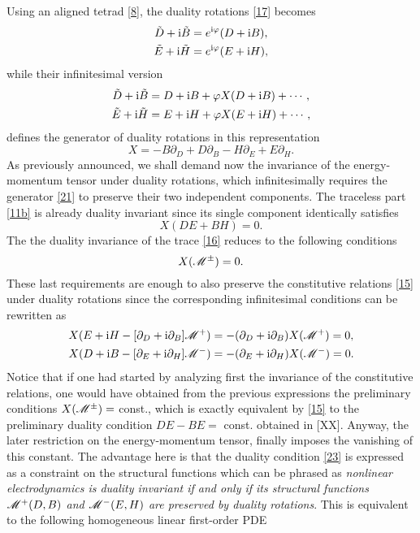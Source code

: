 Using an aligned tetrad \eqref{8}, the duality rotations \eqref{17} becomes
\begin{subequations}\label{19}
	\begin{align}
  \tilde{D}+\mathrm{i}\tilde{B}&=e^{\mathrm{i} \varphi}(D+\mathrm{i} B),\\
  \tilde{E}+\mathrm{i} \tilde{H}&=e^{\mathrm{i} \varphi}(E+\mathrm{i} H),
\end{align}
\end{subequations}
while their infinitesimal version
\begin{subequations}\label{20}
	\begin{align}
  \tilde{D}+\mathrm{i}\tilde{B}&=D+\mathrm{i} B+\varphi X(D+\mathrm{i} B)+\cdots,\\
  \tilde{E}+\mathrm{i} \tilde{H}&=E+\mathrm{i} H+\varphi X(E+\mathrm{i} H)+\cdots,
\end{align}
\end{subequations}
defines the generator of duality rotations in this representation
\begin{equation}\label{21}
  X=-B\partial_D+D\partial_B-H\partial_E+E\partial_H.
\end{equation}
As previously announced, we shall demand now the invariance of the energy-momentum tensor under duality rotations, which infinitesimally requires the generator \eqref{21} to preserve their two independent components. The traceless part \eqref{11b} is already duality invariant since its single component identically satisfies
\begin{equation}\label{22}
  X(DE+BH)=0.
\end{equation}
The the duality invariance of the trace \eqref{16} reduces to the following conditions
\begin{equation}\label{23}
  X(\mathscr{M}^{\pm })=0.
\end{equation}
These last requirements are enough to also preserve the constitutive relations \eqref{15} under duality rotations since the corresponding infinitesimal conditions can be rewritten as
\begin{subequations}
	\begin{align}
  X(E+\mathrm{i} H-[\partial_D+\mathrm{i} \partial_B]\mathscr{M}^+)&=-(\partial_D+\mathrm{i} \partial_B)X(\mathscr{M}^+)=0,\\
  X(D+\mathrm{i} B-[\partial_E+\mathrm{i} \partial_H]\mathscr{M}^-)&=-(\partial_E+\mathrm{i} \partial_H)X(\mathscr{M}^-)=0.
\end{align}
\end{subequations}
Notice that if one had started by analyzing first the invariance of the constitutive relations, one would have obtained from the previous expressions the preliminary conditions $X(\mathscr{M} ^{\pm })=$ const., which is exactly equivalent by \eqref{15} to the preliminary duality condition $DE-BE=$ const. obtained in [XX]. Anyway, the later restriction on the energy-momentum tensor, finally imposes the vanishing of this constant. The advantage here is that the duality condition \eqref{23} is expressed as a constraint on the structural functions which can be phrased as \textit{nonlinear electrodynamics is duality invariant if and only if its structural functions $\mathscr{M}^+(D,B)$ and $\mathscr{M}^-(E,H)$ are preserved by duality rotations}. This is equivalent to the following homogeneous linear first-order PDE
